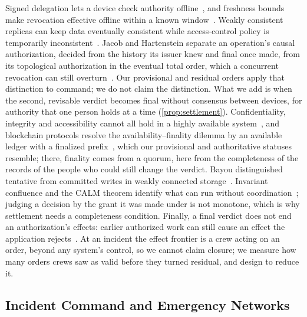 Signed delegation lets a device check authority offline~\cite{lampson1992authentication,rfc2693spki,sudarsan2021survey},
and freshness bounds make revocation effective offline within a known
window~\cite{stubblebine1995recent}. Weakly consistent replicas can keep data eventually
consistent while access-control policy is temporarily inconsistent~\cite{wobber2010policy}.
Jacob and Hartenstein separate an operation's causal authorization, decided from the
history its issuer knew and final once made, from its topological authorization in the
eventual total order, which a concurrent revocation can still
overturn~\cite{jacob2025eventually}. Our provisional and residual orders apply that
distinction to command; we do not claim the distinction. What we add is when the second,
revisable verdict becomes final without consensus between devices, for authority that one
person holds at a time (\cref{prop:settlement}). Confidentiality, integrity and
accessibility cannot all hold in a highly available
system~\cite{yanakieva2021impossibility}, and blockchain protocols resolve the
availability--finality dilemma by an available ledger with a finalized
prefix~\cite{neu2021ebbandflow}, which our provisional and authoritative statuses resemble;
there, finality comes from a quorum, here from the completeness of the records of the
people who could still change the verdict. Bayou distinguished tentative from committed
writes in weakly connected storage~\cite{terry1995bayou}. Invariant confluence and the CALM
theorem identify what can run without coordination~\cite{bailis2014coordination,hellerstein2020calm};
judging a decision by the grant it was made under is not monotone, which is why settlement
needs a completeness condition. Finally, a final verdict does not end an authorization's
effects: earlier authorized work can still cause an effect the application
rejects~\cite{santosgrueiro2026effect}. At an incident the effect frontier is a crew acting
on an order, beyond any system's control, so we cannot claim closure; we measure how many
orders crews saw as valid before they turned residual, and design to reduce it.

\subsection{Incident Command and Emergency Networks}
\label{sec:related-ics}

